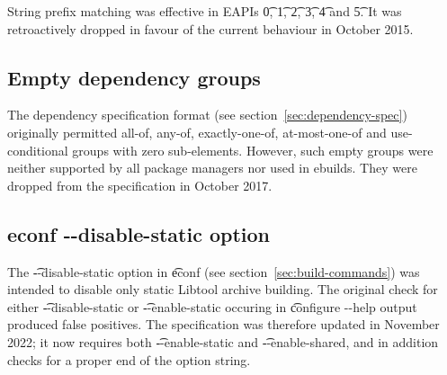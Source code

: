 String prefix matching was effective in EAPIs \t{0}, \t{1}, \t{2}, \t{3}, \t{4} and \t{5}. It was
retroactively dropped in favour of the current behaviour in October 2015.

\subsection{Empty dependency groups}
The dependency specification format (see section~\ref{sec:dependency-spec}) originally permitted
all-of, any-of, exactly-one-of, at-most-one-of and use-conditional groups with zero sub-elements.
However, such empty groups were neither supported by all package managers nor used in ebuilds.
They were dropped from the specification in October 2017.

\subsection{econf -{}-disable-static option}
The \t{-{}-disable-static} option in \t{econf} (see section~\ref{sec:build-commands}) was intended
to disable only static Libtool archive building. The original check for either
\t{-{}-disable-static} or \t{-{}-enable-static} occuring in \t{configure -{}-help} output produced
false positives. The specification was therefore updated in November 2022; it now requires both
\t{-{}-enable-static} and \t{-{}-enable-shared}, and in addition checks for a proper end of the
option string.



